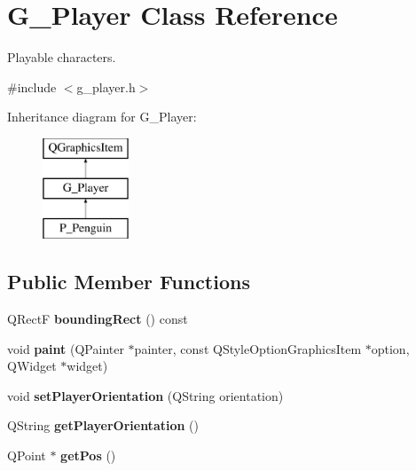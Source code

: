 \hypertarget{class_g___player}{}\section{G\+\_\+\+Player Class Reference}
\label{class_g___player}


Playable characters.  




{\ttfamily \#include $<$g\+\_\+player.\+h$>$}

Inheritance diagram for G\+\_\+\+Player\+:\begin{figure}[H]
\begin{center}
\leavevmode
\includegraphics[height=3.000000cm]{class_g___player}
\end{center}
\end{figure}
\subsection*{Public Member Functions}
\begin{DoxyCompactItemize}
\item 
\hypertarget{class_g___player_abe162dc8cccd9ba0c5408434bfa70c33}{}Q\+Rect\+F {\bfseries bounding\+Rect} () const \label{class_g___player_abe162dc8cccd9ba0c5408434bfa70c33}

\item 
\hypertarget{class_g___player_a45242e1fd39797f9a0faf35d7f200a69}{}void {\bfseries paint} (Q\+Painter $\ast$painter, const Q\+Style\+Option\+Graphics\+Item $\ast$option, Q\+Widget $\ast$widget)\label{class_g___player_a45242e1fd39797f9a0faf35d7f200a69}

\item 
\hypertarget{class_g___player_adbba1c3f6dff3989c6c744447069db62}{}void {\bfseries set\+Player\+Orientation} (Q\+String orientation)\label{class_g___player_adbba1c3f6dff3989c6c744447069db62}

\item 
\hypertarget{class_g___player_aa5bed3813c6b48a61c274326e9dbaedf}{}Q\+String {\bfseries get\+Player\+Orientation} ()\label{class_g___player_aa5bed3813c6b48a61c274326e9dbaedf}

\item 
\hypertarget{class_g___player_aa9a7d1bffee0c02473b6edfd63c6a718}{}Q\+Point $\ast$ {\bfseries get\+Pos} ()\label{class_g___player_aa9a7d1bffee0c02473b6edfd63c6a718}

\end{DoxyCompactItemize}
